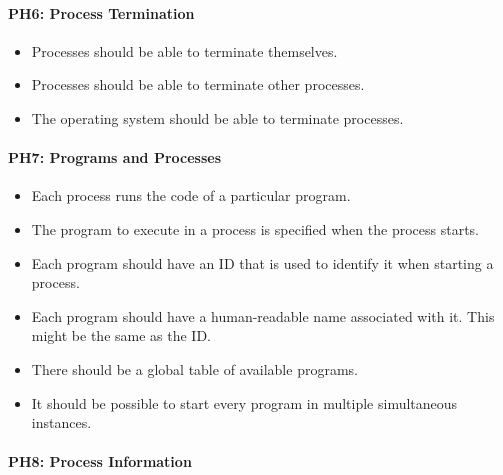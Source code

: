 \paragraph*{PH6: Process Termination}
\label{pg:ph6}

\begin{itemize}
  \item Processes should be able to terminate themselves.
  \item  Processes should be able to terminate other processes.
  \item  The operating system should be able to terminate processes.
\end{itemize}

\paragraph*{PH7: Programs and Processes}
\label{pg:ph7}

\begin{itemize}
  \item Each process runs the code of a particular program.
  \item  The program to execute in a process is specified when the process starts.
  \item  Each program should have an ID that is used to identify it when starting a process.
  \item  Each program should have a human-readable name associated with it. This might be the same as the ID.
  \item  There should be a global table of available programs.
  \item  It should be possible to start every program in multiple simultaneous instances.
\end{itemize}

\paragraph*{PH8: Process Information}
\label{pg:ph8}

